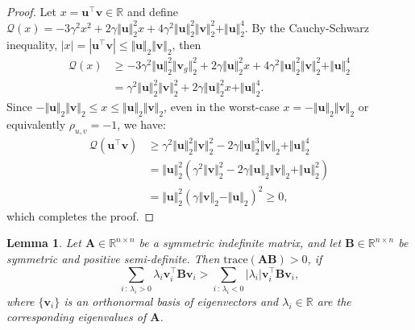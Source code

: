 \documentclass[a4paper, 12pt]{article}
\newcommand{\trace}{\mathrm{trace}}
\newcommand{\T}{\top}
\def\bu{\boldsymbol{u}}
\def\bv{\boldsymbol{v}}
\def\bA{\mathbf{A}}
\def\bB{\mathbf{B}}
\def\bu{\mathbf{u}}
\def\bv{\mathbf{v}}
\newtheorem{lemma}{Lemma}
\begin{document}
\begin{proof}
Let $x = \boldsymbol{u}^{\T} \boldsymbol{v}\in\mathbb{R}$ and define $\mathcal{Q}(x) = -3\gamma^2 x^2 + 2\gamma \Vert \boldsymbol{u} \Vert_2^2 x + 4\gamma^2 \Vert \boldsymbol{u} \Vert_2^2 \Vert \boldsymbol{v} \Vert_2^2 + \Vert \boldsymbol{u} \Vert_2^4$. By the Cauchy-Schwarz inequality, $|x| = |\boldsymbol{u}^{\T} \boldsymbol{v}| \leq \Vert \boldsymbol{u} \Vert_2 \Vert \boldsymbol{v} \Vert_2$, then
%
\begin{align*}
\mathcal{Q}(x) &\geq -3\gamma^2 \Vert \boldsymbol{u} \Vert_2^2 \Vert \boldsymbol{v}_g \Vert_2^2 + 2\gamma \Vert \boldsymbol{u} \Vert_2^2 x + 4\gamma^2 \Vert \boldsymbol{u} \Vert_2^2 \Vert \boldsymbol{v} \Vert_2^2 + \Vert \boldsymbol{u} \Vert_2^4 \\
&= \gamma^2 \Vert \boldsymbol{u} \Vert_2^2 \Vert \boldsymbol{v} \Vert_2^2 + 2\gamma \Vert \boldsymbol{u} \Vert_2^2 x + \Vert \boldsymbol{u} \Vert_2^4.
\end{align*}
Since $-\Vert \boldsymbol{u} \Vert_2 \Vert \boldsymbol{v} \Vert_2\leq x \leq \Vert \boldsymbol{u} \Vert_2 \Vert \boldsymbol{v} \Vert_2$, even in the worst-case $x = -\Vert \boldsymbol{u} \Vert_2 \Vert \boldsymbol{v} \Vert_2$ or equivalently $\rho_{u,v} = -1$, we have:
\begin{align*}
\mathcal{Q}(\bu^{\T}\bv) &\geq \gamma^2 \Vert \boldsymbol{u} \Vert_2^2 \Vert \boldsymbol{v} \Vert_2^2 - 2\gamma \Vert \boldsymbol{u} \Vert_2^3 \Vert \boldsymbol{v} \Vert_2 + \Vert \boldsymbol{u} \Vert_2^4 \\
&= \Vert \boldsymbol{u} \Vert_2^2 \left( \gamma^2 \Vert \boldsymbol{v} \Vert_2^2 - 2\gamma \Vert \boldsymbol{u} \Vert_2 \Vert \boldsymbol{v} \Vert_2 + \Vert \boldsymbol{u} \Vert_2^2 \right) \\
&= \Vert \boldsymbol{u} \Vert_2^2 \left( \gamma \Vert \boldsymbol{v} \Vert_2 - \Vert \boldsymbol{u} \Vert_2 \right)^2 \geq 0,
\end{align*}
which completes the proof.
\end{proof}
\begin{lemma}%
\label{lemma:traceAB_sufficient_condition}
Let $\bA \in \mathbb{R}^{n \times n}$ be a symmetric indefinite matrix, and let $\bB \in \mathbb{R}^{n \times n}$ be symmetric and positive semi-definite. Then $\trace(\bA\bB) > 0$, if
\begin{equation*}
\sum_{i\,:\,\lambda_i > 0} \lambda_i \bv_i^{\T} \bB \bv_i > \sum_{i\,:\,\lambda_i < 0} |\lambda_i| \bv_i^{\T} \bB \bv_i,
\end{equation*}
where $\{\bv_i\}$ is an orthonormal basis of eigenvectors and $\lambda_i \in \mathbb{R}$ are the corresponding eigenvalues of $\bA$.
\end{lemma}
\end{document}
